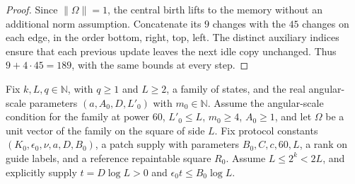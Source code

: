 \begin{proof}\leanok
    Since $\|\Omega\|=1$, the central birth lifts to the memory without an
    additional norm assumption.
    Concatenate its $9$ changes with the $45$ changes on each edge, in the
    order bottom, right, top, left. The distinct auxiliary indices ensure
    that each previous update leaves the next idle copy unchanged. Thus
    $9+4\cdot45=189$, with the same bounds at every step.
\end{proof}

\begin{lemma}
    \label{thm:peps_protocol_large_repainting_segment}
    \leanok
    Fix $k,L,q\in\mathbb N$, with $q\ge1$ and $L\ge2$, a family of states,
    and the real angular-scale parameters $(a,A_0,D,L'_0)$ with
    $m_0\in\mathbb N$. Assume the angular-scale condition for the family at
    power $60$, $L'_0\le L$, $m_0\ge4$, $A_0\ge1$, and let $\Omega$ be a
    unit vector of the family on the square of side $L$.
    Fix protocol constants $(K_0,\epsilon_0,\nu,a,D,B_0)$, a patch supply
    with parameters $B_0,C,c,60,L$, a rank on guide labels, and a reference
    repaintable square $R_0$. Assume $L\le2^k<2L$, and explicitly supply
    $t=D\log L>0$ and $\epsilon_0t\le B_0\log L$.


\end{lemma}
